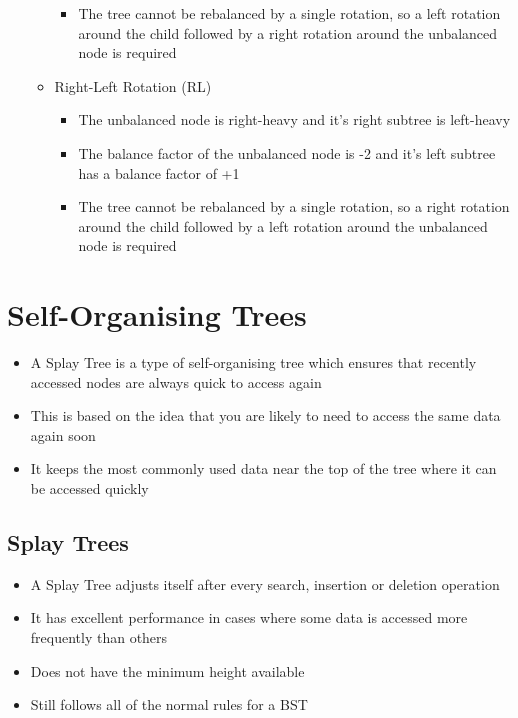 \begin{itemize}
\begin{itemize}
\begin{itemize}
      \item The tree cannot be rebalanced by a single rotation, so a left rotation around the child followed by a right rotation around the unbalanced node is required
    \end{itemize}
    \item Right-Left Rotation (RL)
    \begin{itemize}
      \item The unbalanced node is right-heavy and it's right subtree is left-heavy
      \item The balance factor of the unbalanced node is -2 and it's left subtree has a balance factor of +1
      \item The tree cannot be rebalanced by a single rotation, so a right rotation around the child followed by a left rotation around the unbalanced node is required
    \end{itemize}
  \end{itemize}
\end{itemize}

\section*{Self-Organising Trees}

\begin{itemize}
  \item A Splay Tree is a type of self-organising tree which ensures that recently accessed nodes are always quick to access again
  \item This is based on the idea that you are likely to need to access the same data again soon
  \item It keeps the most commonly used data near the top of the tree where it can be accessed quickly
\end{itemize}

\subsection*{Splay Trees}

\begin{itemize}
  \item A Splay Tree adjusts itself after every search, insertion or deletion operation
  \item It has excellent performance in cases where some data is accessed more frequently than others
  \item Does not have the minimum height available
  \item Still follows all of the normal rules for a BST
\end{itemize}

